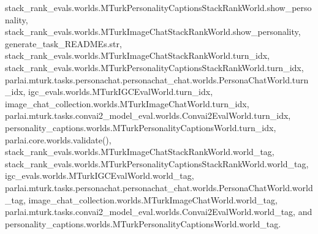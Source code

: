 stack\+\_\+rank\+\_\+evals.\+worlds.\+M\+Turk\+Personality\+Captions\+Stack\+Rank\+World.\+show\+\_\+personality, stack\+\_\+rank\+\_\+evals.\+worlds.\+M\+Turk\+Image\+Chat\+Stack\+Rank\+World.\+show\+\_\+personality, generate\+\_\+task\+\_\+\+R\+E\+A\+D\+M\+Es.\+str, stack\+\_\+rank\+\_\+evals.\+worlds.\+M\+Turk\+Image\+Chat\+Stack\+Rank\+World.\+turn\+\_\+idx, stack\+\_\+rank\+\_\+evals.\+worlds.\+M\+Turk\+Personality\+Captions\+Stack\+Rank\+World.\+turn\+\_\+idx, parlai.\+mturk.\+tasks.\+personachat.\+personachat\+\_\+chat.\+worlds.\+Persona\+Chat\+World.\+turn\+\_\+idx, igc\+\_\+evals.\+worlds.\+M\+Turk\+I\+G\+C\+Eval\+World.\+turn\+\_\+idx, image\+\_\+chat\+\_\+collection.\+worlds.\+M\+Turk\+Image\+Chat\+World.\+turn\+\_\+idx, parlai.\+mturk.\+tasks.\+convai2\+\_\+model\+\_\+eval.\+worlds.\+Convai2\+Eval\+World.\+turn\+\_\+idx, personality\+\_\+captions.\+worlds.\+M\+Turk\+Personality\+Captions\+World.\+turn\+\_\+idx, parlai.\+core.\+worlds.\+validate(), stack\+\_\+rank\+\_\+evals.\+worlds.\+M\+Turk\+Image\+Chat\+Stack\+Rank\+World.\+world\+\_\+tag, stack\+\_\+rank\+\_\+evals.\+worlds.\+M\+Turk\+Personality\+Captions\+Stack\+Rank\+World.\+world\+\_\+tag, igc\+\_\+evals.\+worlds.\+M\+Turk\+I\+G\+C\+Eval\+World.\+world\+\_\+tag, parlai.\+mturk.\+tasks.\+personachat.\+personachat\+\_\+chat.\+worlds.\+Persona\+Chat\+World.\+world\+\_\+tag, image\+\_\+chat\+\_\+collection.\+worlds.\+M\+Turk\+Image\+Chat\+World.\+world\+\_\+tag, parlai.\+mturk.\+tasks.\+convai2\+\_\+model\+\_\+eval.\+worlds.\+Convai2\+Eval\+World.\+world\+\_\+tag, and personality\+\_\+captions.\+worlds.\+M\+Turk\+Personality\+Captions\+World.\+world\+\_\+tag.

